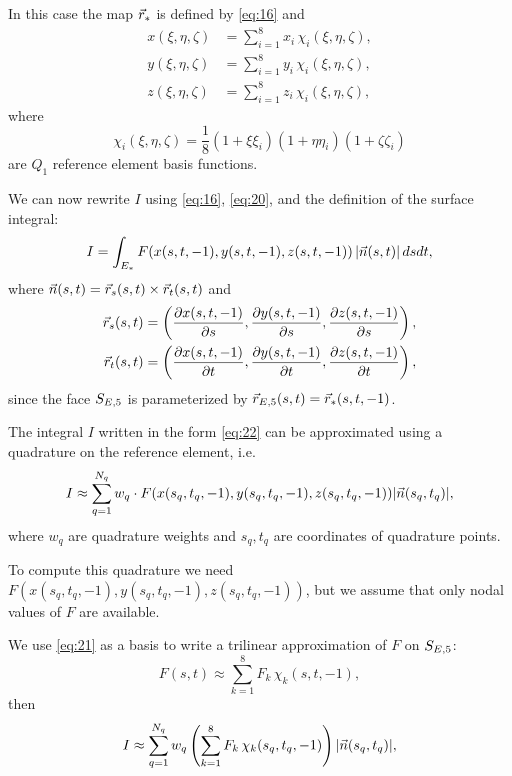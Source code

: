 \documentclass[11pt]{article}
\begin{document}
In this case the map $\vec r_{*}$ is defined by \eqref{eq:16} and
\begin{equation}
\label{eq:20}
\begin{aligned}
x(\xi,\eta,\zeta) &= \sum_{i=1}^{8} x_{i}\, \chi_{i}(\xi, \eta, \zeta),\\
y(\xi,\eta,\zeta) &= \sum_{i=1}^{8} y_{i}\, \chi_{i}(\xi, \eta, \zeta),\\
z(\xi,\eta,\zeta) &= \sum_{i=1}^{8} z_{i}\, \chi_{i}(\xi, \eta, \zeta),
\end{aligned}
\end{equation}
where
\begin{equation}
\label{eq:21}
\chi_{i}(\xi,\eta,\zeta) = \frac18 (1 + \xi\xi_{i})(1 + \eta\eta_{i})(1 + \zeta\zeta_{i})
\end{equation}
are $Q_{1}$ reference element basis functions.

We can now rewrite $I$ using \eqref{eq:16}, \eqref{eq:20}, and the definition of the surface integral:
\begin{equation}
\label{eq:22}
I = \int_{E_{*}} F(x(s,t,-1), y(s,t,-1), z(s,t,-1))\, | \vec n(s,t) |\,dsdt,
\end{equation}
where $\vec n(s,t) = \vec r_{s}(s,t) \times \vec r_{t}(s,t)$ and
\begin{equation}
\label{eq:23}
\begin{aligned}
\vec r_{s}(s,t) &= \left(\frac{\partial x(s,t,-1)}{\partial s}, \frac{\partial y(s,t,-1)}{\partial s}, \frac{\partial z(s,t,-1)}{\partial s}\right),\\
\vec r_{t}(s,t) &= \left(\frac{\partial x(s,t,-1)}{\partial t}, \frac{\partial y(s,t,-1)}{\partial t}, \frac{\partial z(s,t,-1)}{\partial t}\right),
\end{aligned}
\end{equation}
since the face $S_{E,5}$ is parameterized by $\vec r_{E,5}(s, t) = \vec r_{*}(s, t, -1)$.

The integral $I$ written in the form \eqref{eq:22} can be approximated
using a quadrature on the reference element, i.e.
\begin{equation}
\label{eq:24}
I \approx \sum_{q=1}^{N_{q}} w_{q}\cdot F(x(s_{q},t_{q},-1), y(s_{q},t_{q},-1), z(s_{q},t_{q},-1)) | \vec n(s_{q},t_{q}) |,
\end{equation}
where $w_{q}$ are quadrature weights and $s_{q}, t_{q}$ are
coordinates of quadrature points.

To compute this quadrature we need
$F(x(s_{q},t_{q},-1), y(s_{q},t_{q},-1), z(s_{q},t_{q},-1))$, but we
assume that only nodal values of $F$ are available.

We use \eqref{eq:21} as a basis to write a trilinear approximation of $F$ on $S_{E,5}$:
\begin{equation}
\label{eq:25}
F(s,t) \approx \sum_{k=1}^{8} F_{k}\,\chi_{k}(s, t, -1),
\end{equation}
then
\begin{equation}
\label{eq:26}
I \approx \sum_{q=1}^{N_{q}} w_{q}\left( \sum_{k=1}^{8} F_{k}\,\chi_{k}(s_{q}, t_{q}, -1) \right) | \vec n(s_{q},t_{q}) |,
\end{equation}
\end{document}
